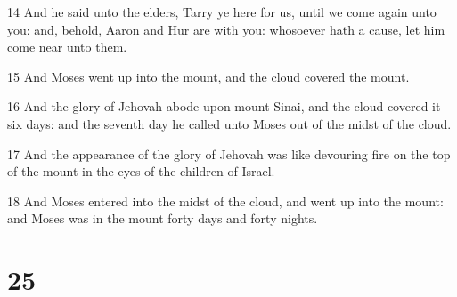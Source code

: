 \par 14 And he said unto the elders, Tarry ye here for us, until we come again unto you: and, behold, Aaron and Hur are with you: whosoever hath a cause, let him come near unto them.
\par 15 And Moses went up into the mount, and the cloud covered the mount.
\par 16 And the glory of Jehovah abode upon mount Sinai, and the cloud covered it six days: and the seventh day he called unto Moses out of the midst of the cloud.
\par 17 And the appearance of the glory of Jehovah was like devouring fire on the top of the mount in the eyes of the children of Israel.
\par 18 And Moses entered into the midst of the cloud, and went up into the mount: and Moses was in the mount forty days and forty nights.

\chapter{25}

